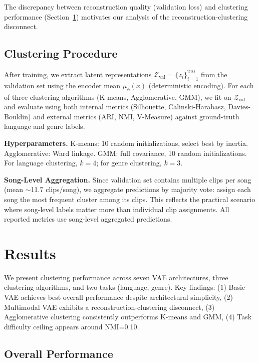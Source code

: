 \documentclass[10pt,twocolumn]{article}
\begin{document}
The discrepancy between reconstruction quality (validation loss) and clustering performance (Section~\ref{sec:results}) motivates our analysis of the reconstruction-clustering disconnect.

\subsection{Clustering Procedure}

After training, we extract latent representations $\mathcal{Z}_{\text{val}} = \{z_i\}_{i=1}^{210}$ from the validation set using the encoder mean $\mu_\phi(x)$ (deterministic encoding). For each of three clustering algorithms (K-means, Agglomerative, GMM), we fit on $\mathcal{Z}_{\text{val}}$ and evaluate using both internal metrics (Silhouette, Calinski-Harabasz, Davies-Bouldin) and external metrics (ARI, NMI, V-Measure) against ground-truth language and genre labels.

\textbf{Hyperparameters.} K-means: 10 random initializations, select best by inertia. Agglomerative: Ward linkage. GMM: full covariance, 10 random initializations. For language clustering, $k=4$; for genre clustering, $k=3$.

\textbf{Song-Level Aggregation.} Since validation set contains multiple clips per song (mean $\sim$11.7 clips/song), we aggregate predictions by majority vote: assign each song the most frequent cluster among its clips. This reflects the practical scenario where song-level labels matter more than individual clip assignments. All reported metrics use song-level aggregated predictions.

\section{Results}
\label{sec:results}

We present clustering performance across seven VAE architectures, three clustering algorithms, and two tasks (language, genre). Key findings: (1) Basic VAE achieves best overall performance despite architectural simplicity, (2) Multimodal VAE exhibits a reconstruction-clustering disconnect, (3) Agglomerative clustering consistently outperforms K-means and GMM, (4) Task difficulty ceiling appears around NMI=0.10.

\subsection{Overall Performance}
\end{document}
